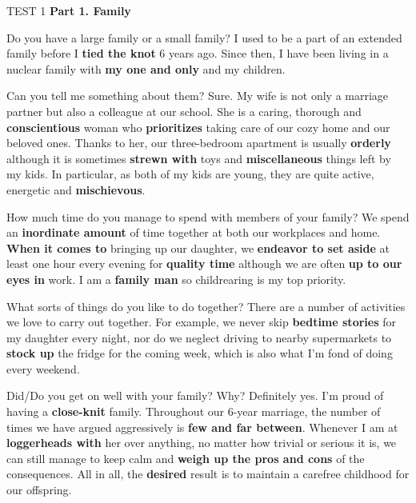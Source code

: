 \documentclass[a4paper,12pt]{article}
\begin{document}
\begin{glossarymc}[Cambridge 3]

\begin{test}{TEST 1}
\textbf{Part 1. Family}
    \begin{qa}{Do you have a large family or a small family?}
        I used to be a part of an extended family before I \textbf{tied the knot} 6 years ago. 
        Since then, I have been living in a nuclear family with \textbf{my one and only} and my children.
    \end{qa}

    \begin{qa}{Can you tell me something about them?}
        Sure. My wife is not only a marriage partner but also a colleague at our school. 
        She is a caring, thorough and \textbf{conscientious} woman who \textbf{prioritizes} taking care of our cozy home and our beloved ones. 
        Thanks to her, our three-bedroom apartment is usually \textbf{orderly} although it is sometimes \textbf{strewn with} toys and \textbf{miscellaneous} things left by my kids. 
        In particular, as both of my kids are young, they are quite active, energetic and \textbf{mischievous}.
    \end{qa}

    \begin{qa}{How much time do you manage to spend with members of your family?}
        We spend an \textbf{inordinate amount} of time together at both our workplaces and home. 
        \textbf{When it comes to} bringing up our daughter, we \textbf{endeavor to set aside} at least one hour every evening for \textbf{quality time} although we are often \textbf{up to our eyes in} work. 
        I am a \textbf{family man} so childrearing is my top priority.
    \end{qa}

    \begin{qa}{What sorts of things do you like to do together?}
        There are a number of activities we love to carry out together. 
        For example, we never skip \textbf{bedtime stories} for my daughter every night, nor do we neglect driving to nearby supermarkets to \textbf{stock up} the fridge for the coming week, which is also what I'm fond of doing every weekend.
    \end{qa}

    \begin{qa}{Did/Do you get on well with your family? Why?}
        Definitely yes. I'm proud of having a \textbf{close-knit} family. 
        Throughout our 6-year marriage, the number of times we have argued aggressively is \textbf{few and far between}. 
        Whenever I am at \textbf{loggerheads with} her over anything, no matter how trivial or serious it is, we can still manage to keep calm and \textbf{weigh up the pros and cons} of the consequences. 
        All in all, the \textbf{desired} result is to maintain a carefree childhood for our offspring.
    \end{qa}


\end{test}
\end{glossarymc}
\end{document}
